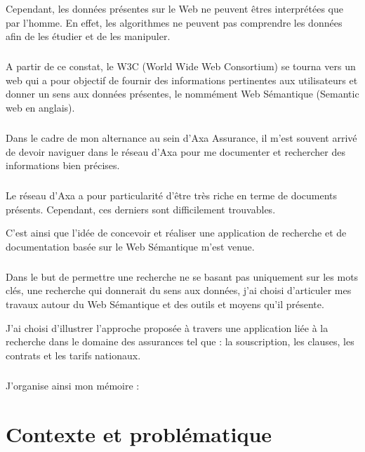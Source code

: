 \documentclass[12pt, a4paper, oneside]{book}
\begin{document}
Cependant, les données présentes sur le Web ne peuvent êtres interprétées que par l'homme. En effet, les algorithmes ne peuvent pas comprendre les données afin de les étudier et de les manipuler.
\paragraph{}
A partir de ce constat, le W3C (World Wide Web Consortium) se tourna vers un web qui a pour objectif de fournir des informations pertinentes aux utilisateurs et donner un sens aux données présentes, le nommément Web Sémantique (Semantic web en anglais).
\paragraph{}
Dans le cadre de mon alternance au sein d'Axa Assurance, il m'est souvent arrivé de devoir naviguer dans le réseau d'Axa pour me documenter et rechercher des informations bien précises.
\paragraph{}

Le réseau d'Axa a pour particularité d'être très riche en terme de documents présents.
Cependant, ces derniers sont difficilement trouvables.


C'est ainsi que l'idée de concevoir et réaliser une application de recherche et de documentation basée sur le Web Sémantique m'est venue.


\paragraph{}
Dans le but de permettre une recherche ne se basant pas uniquement sur les mots clés, une recherche qui donnerait du sens aux données, j'ai choisi d'articuler mes travaux autour du Web Sémantique et des outils et moyens qu'il présente. 


J'ai choisi d'illustrer l'approche proposée à travers une application liée à la recherche dans le domaine des assurances tel que : la souscription, les clauses, les contrats et les tarifs nationaux.  





\paragraph{}
J'organise ainsi mon mémoire : 


\chapter{Contexte et problématique}
\end{document}
